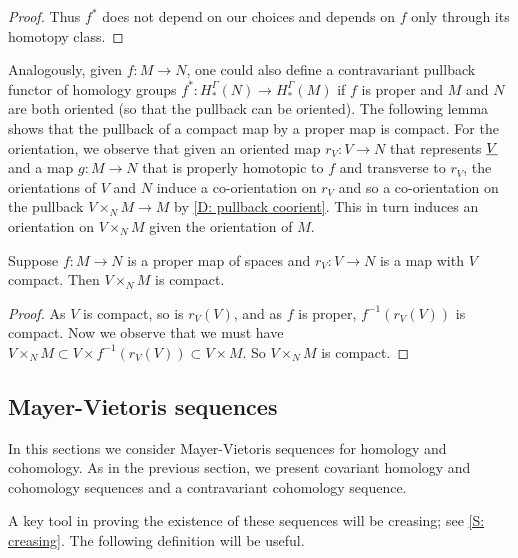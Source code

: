 \begin{proof}
	Thus $f^*$ does not depend on our choices and depends on $f$ only through its homotopy class.
\end{proof}

\begin{remark}\label{R: homology transfer}
	Analogously, given $f \colon M \to N$, one could also define a contravariant pullback functor of homology groups $f^*: H_*^\Gamma(N) \to H_*^\Gamma(M)$ if $f$ is proper and $M$ and $N$ are both oriented (so that the pullback can be oriented).
	The following lemma shows that the pullback of a compact map by a proper map is compact.
	For the orientation, we observe that given an oriented map $r_V \colon V \to N$ that represents $\underline{V}$ and a map $g \colon M \to N$ that is properly homotopic to $f$ and transverse to $r_V$, the orientations of $V$ and $N$ induce a co-orientation on $r_V$ and so a co-orientation on the pullback $V \times_N M \to M$ by \cref{D: pullback coorient}.
	This in turn induces an orientation on $V \times_N M$ given the orientation of $M$.
\end{remark}

\begin{lemma}\label{L: compact pullback}
	Suppose $f \colon M \to N$ is a proper map of spaces and $r_V \colon V \to N$ is a map with $V$ compact.
	Then $V \times_N M$ is compact.
\end{lemma}

\begin{proof}
	As $V$ is compact, so is $r_V(V)$, and as $f$ is proper, $f^{-1}(r_V(V))$ is compact.
	Now we observe that we must have $V \times_N M \subset V \times f^{-1}(r_V(V)) \subset V \times M$.
	So $V \times_N M$ is compact.
\end{proof}

\subsection{Mayer-Vietoris sequences}

In this sections we consider Mayer-Vietoris sequences for homology and cohomology.
As in the previous section, we present covariant homology and cohomology sequences and a contravariant cohomology sequence.

A key tool in proving the existence of these sequences will be creasing; see \cref{S: creasing}.
The following definition will be useful.

